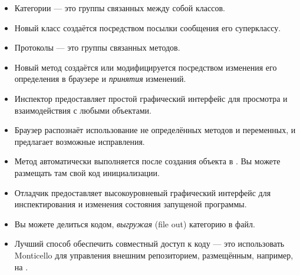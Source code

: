 \documentclass[a4paper,10pt,twoside]{book}
\begin{document}
\begin{itemize}
  \item Категории --- это группы связанных между собой классов.
  \item Новый класс создаётся посредством посылки сообщения его суперклассу.
  \item Протоколы --- это группы связанных методов.
  \item Новый метод создаётся или модифицируется посредством изменения его определения в браузере и \emph{принятия} изменений.
  \item Инспектор предоставляет простой графический интерфейс для просмотра и взаимодействия с любыми объектами.
  \item Браузер распознаёт использование не определённых методов и переменных, и предлагает возможные исправления.
  \item Метод  автоматически выполняется после создания объекта в \pharo. Вы можете размещать там свой код инициализации.
  \item Отладчик предоставляет высокоуровневый графический интерфейс для инспектирования и изменения состояния запущеной программы.
  \item Вы можете делиться кодом, \emph{выгружая} (file out) категорию в файл. 
  \item Лучший способ обеспечить совместный доступ к коду --- это использовать Monticello для управления внешним репозиторием, размещённым, например, на \sqsrc.
\end{itemize}

\ifx\wholebook\relax\else
\end{document}
